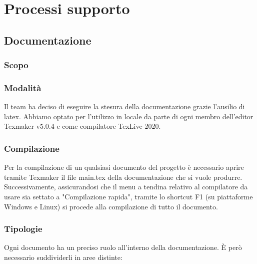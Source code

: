 \section{Processi supporto}
\subsection{Documentazione}
\subsubsection{Scopo}
\subsubsection{Modalità}
Il team ha deciso di eseguire la stesura della documentazione grazie l'ausilio di latex. Abbiamo optato per l'utilizzo in locale da parte di ogni membro dell'editor Texmaker v5.0.4 e come compilatore TexLive 2020.
\subsubsection{Compilazione}
Per la compilazione di un qualsiasi documento del progetto è necessario aprire tramite Texmaker il file main.tex della documentazione che si vuole produrre. Successivamente, assicurandosi che il menu a tendina relativo al compilatore da usare sia settato a "Compilazione rapida", tramite lo shortcut F1 (su piattaforme Windows e Linux) si procede alla compilazione di tutto il documento.
\subsubsection{Tipologie}
Ogni documento ha un preciso ruolo all'interno della documentazione. È però necessario suddividerli in aree distinte:
